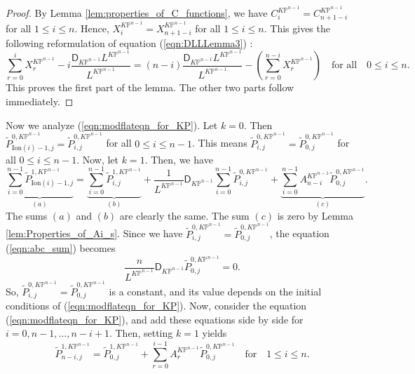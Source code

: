 \documentclass[12pt]{amsart}
\numberwithin{equation}{section}
\newcommand{\KP}{K\mathbb{P}}
\begin{document}
\begin{proof}
By Lemma \ref{lem:properties_of_C_functions}, we have $C^{\KP^{n-1}}_i=C^{\KP^{n-1}}_{n+1-i}$ for all $1\leq{i}\leq{n}$. Hence,  $X^{\KP^{n-1}}_i=X^{\KP^{n-1}}_{n+1-i}$ for all $1\leq{i}\leq{n}$. This gives the following reformulation of equation (\ref{eqn:DLLLemma3}) :
\begin{equation*}
\sum_{r=0}^{i} X^{\KP^{n-1}}_{r}-i\frac{\mathsf{D}_{\KP^{n-1}} L^{\KP^{n-1}}}{L^{\KP^{n-1}}}=(n-i) \frac{\mathsf{D}_{\KP^{n-1}} L^{\KP^{n-1}}}{L^{\KP^{n-1}}}-\left(\sum_{r=0}^{n-i} X^{\KP^{n-1}}_{r}\right)\quad\text{for all}\quad 0\leq{i}\leq{n}.
\end{equation*}
This proves the first part of the lemma. The other two parts follow immediately.
\end{proof}

Now we analyze (\ref{eqn:modflateqn_for_KP}). Let $k=0$. Then $\widetilde{P}_{\mathrm{Ion}(i)-1,j}^{0,\KP^{n-1}}=\widetilde{P}_{i,j}^{0,\KP^{n-1}}$ for all $0\leq{i}\leq{n-1}$. This means $\widetilde{P}_{i,j}^{0,\KP^{n-1}}=\widetilde{P}_{0,j}^{0,\KP^{n-1}}$ for all $0\leq{i}\leq{n-1}$. Now, let $k=1$. Then, we have
\begin{equation}\label{eqn:abc_sum}
\underbrace{\sum_{i=0}^{n-1}\widetilde{P}_{\mathrm{Ion}(i)-1,j}^{1,\KP^{n-1}}}_{(a)}=\underbrace{\sum_{i=0}^{n-1}\widetilde{P}_{i,j}^{1,\KP^{n-1}}}_{(b)}+\frac{1}{L^{\KP^{n-1}}}\mathsf{D}_{\KP^{n-1}}\sum_{i=0}^{n-1}\widetilde{P}_{i,j}^{0,\KP^{n-1}}+\underbrace{\sum_{i=0}^{n-1}A^{\KP^{n-1}}_{n-i}\widetilde{P}_{0,j}^{0,\KP^{n-1}}}_{(c)}.
\end{equation}
The sums $(a)$ and $(b)$ are clearly the same. The sum $(c)$ is zero by Lemma \ref{lem:Properties_of_Ai_s}. Since we have $\widetilde{P}_{i,j}^{0,\KP^{n-1}}=\widetilde{P}_{0,j}^{0,\KP^{n-1}}$, the equation (\ref{eqn:abc_sum}) becomes 
\begin{equation*}
\frac{n}{L^{\KP^{n-1}}}\mathsf{D}_{\KP^{n-1}}\widetilde{P}_{0,j}^{0,\KP^{n-1}}=0.
\end{equation*}
So, $\widetilde{P}_{i,j}^{0,\KP^{n-1}}=\widetilde{P}_{0,j}^{0,\KP^{n-1}}$ is a constant, and its value depends on the initial conditions of (\ref{eqn:modflateqn_for_KP}). Now, consider the equation (\ref{eqn:modflateqn_for_KP}), and add these equations side by side for $i=0,n-1,\ldots,n-i+1$. Then, setting $k=1$ yields
\begin{equation}\label{eqn:P1_sum_KP}
\widetilde{P}_{n-i,j}^{1,\KP^{n-1}}=\widetilde{P}_{0, j}^{1,\KP^{n-1}}+\sum_{r=0}^{i-1} A^{\KP^{n-1}}_{r} \widetilde{P}_{0, j}^{0,\KP^{n-1}}\quad\text{for}\quad 1\leq{i}\leq{n}.
\end{equation}
\end{document}
